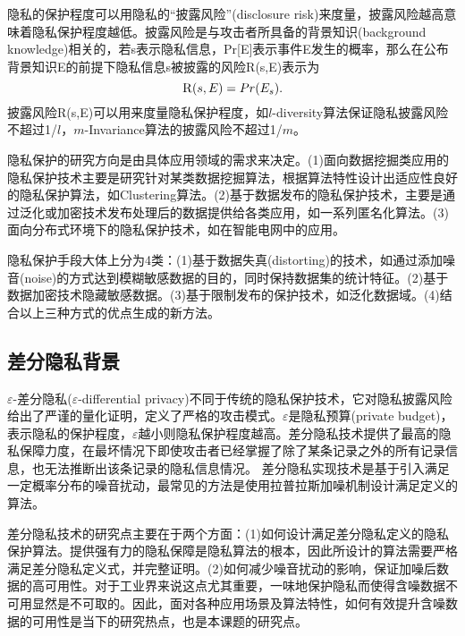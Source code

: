 隐私的保护程度可以用隐私的“披露风险”(disclosure risk)\supercite{l-diversity}来度量，披露风险越高意味着隐私保护程度越低。披露风险是与攻击者所具备的背景知识(background knowledge)相关的\supercite{dp-summary}，若s表示隐私信息，Pr[E]表示事件E发生的概率，那么在公布背景知识E的前提下隐私信息s被披露的风险\textsc{R}(s,E)表示为
\[
	\textsc{R}(s,E) = Pr(E_{s}).
\]
披露风险\textsc{R}(s,E)可以用来度量隐私保护程度，如$l$-diversity算法\supercite{l-diversity}保证隐私披露风险不超过1/$l$，$m$-Invariance算法\cite{m-Invariance}的披露风险不超过1/$m$。

隐私保护的研究方向是由具体应用领域的需求来决定。(1)面向数据挖掘类应用的隐私保护技术主要是研究针对某类数据挖掘算法，根据算法特性设计出适应性良好的隐私保护算法，如Clustering\supercite{clustering}算法。(2)基于数据发布的隐私保护技术，主要是通过泛化或加密技术发布处理后的数据提供给各类应用，如一系列匿名化算法\supercite{multidimensional k anonymity}。(3)面向分布式环境下的隐私保护技术，如在智能电网中的应用\supercite{Distributed Privacy}。

隐私保护手段大体上分为4类：(1)基于数据失真(distorting)的技术，如通过添加噪音(noise)的方式达到模糊敏感数据的目的，同时保持数据集的统计特征。(2)基于数据加密技术隐藏敏感数据。(3)基于限制发布的保护技术，如泛化数据域。(4)结合以上三种方式的优点生成的新方法。


\subsection{差分隐私背景} %

$\varepsilon$-差分隐私($\varepsilon$-differential privacy)\supercite{Dwork-Calibrating}不同于传统的隐私保护技术，它对隐私披露风险给出了严谨的量化证明，定义了严格的攻击模式。$\varepsilon$是隐私预算(private budget)，表示隐私的保护程度，$\varepsilon$越小则隐私保护程度越高。差分隐私技术提供了最高的隐私保障力度，在最坏情况下即使攻击者已经掌握了除了某条记录之外的所有记录信息，也无法推断出该条记录的隐私信息情况。
差分隐私实现技术是基于引入满足一定概率分布的噪音扰动，最常见的方法是使用拉普拉斯加噪机制\supercite{Dwork-Calibrating}设计满足定义的算法。

差分隐私技术的研究点主要在于两个方面：(1)如何设计满足差分隐私定义的隐私保护算法。提供强有力的隐私保障是隐私算法的根本，因此所设计的算法需要严格满足差分隐私定义式，并完整证明。(2)如何减少噪音扰动的影响，保证加噪后数据的高可用性。对于工业界来说这点尤其重要，一味地保护隐私而使得含噪数据不可用显然是不可取的。因此，面对各种应用场景及算法特性，如何有效提升含噪数据的可用性是当下的研究热点，也是本课题的研究点。

